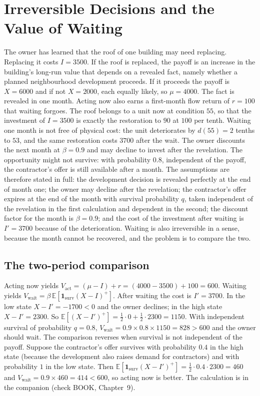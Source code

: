 \chapter{Irreversible Decisions and the Value of Waiting}\label{ch:9}

The owner has learned that the roof of one building may need replacing. Replacing it costs $I=3500$. If the roof is replaced, the payoff is an increase in the building's long-run value that depends on a revealed fact, namely whether a planned neighbourhood development proceeds. If it proceeds the payoff is $X=6000$ and if not $X=2000$, each equally likely, so $\mu=4000$. The fact is revealed in one month. Acting now also earns a first-month flow return of $r=100$ that waiting forgoes. The roof belongs to a unit now at condition $55$, so that the investment of $I=3500$ is exactly the restoration to $90$ at $100$ per tenth. Waiting one month is not free of physical cost: the unit deteriorates by $d(55)=2$ tenths to $53$, and the same restoration costs $3700$ after the wait. The owner discounts the next month at $\beta=0.9$ and may decline to invest after the revelation. The opportunity might not survive: with probability $0.8$, independent of the payoff, the contractor's offer is still available after a month. The assumptions are therefore stated in full: the development decision is revealed perfectly at the end of month one; the owner may decline after the revelation; the contractor's offer expires at the end of the month with survival probability $q$, taken independent of the revelation in the first calculation and dependent in the second; the discount factor for the month is $\beta=0.9$; and the cost of the investment after waiting is $I'=3700$ because of the deterioration. Waiting is also irreversible in a sense, because the month cannot be recovered, and the problem is to compare the two.

\section{The two-period comparison}

Acting now yields $V_{\mathrm{act}}=(\mu-I)+r=(4000-3500)+100=600$. Waiting yields $V_{\mathrm{wait}}=\beta\,\mathbb E[\mathbf 1_{\mathrm{surv}}(X-I)^+]$. After waiting the cost is $I'=3700$. In the low state $X-I'=-1700<0$ and the owner declines; in the high state $X-I'=2300$. So $\mathbb E[(X-I')^+]=\tfrac12\cdot 0+\tfrac12\cdot 2300=1150$. With independent survival of probability $q=0.8$, $V_{\mathrm{wait}}=0.9\times 0.8\times 1150=828>600$ and the owner should wait. The comparison reverses when survival is not independent of the payoff. Suppose the contractor's offer survives with probability $0.4$ in the high state (because the development also raises demand for contractors) and with probability $1$ in the low state. Then $\mathbb E[\mathbf 1_{\mathrm{surv}}(X-I')^+]=\tfrac12\cdot 0.4\cdot 2300=460$ and $V_{\mathrm{wait}}=0.9\times 460=414<600$, so acting now is better. The calculation is in the companion (check BOOK, Chapter~9).

